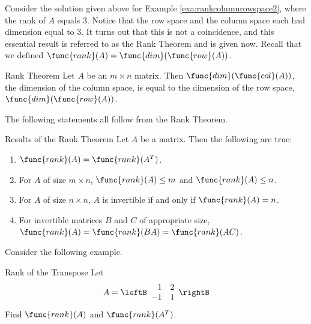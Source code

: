 Consider the solution given above for Example
\ref{exa:rankcolumnrowspace2}, where the rank of $A$ equals
$3$. Notice that the row space and the column space each had dimension
equal to $3$. It turns out that this is not a coincidence, and this
essential result is referred to as the Rank Theorem and is given
now. Recall that we defined $\func{rank}(A) = \func{dim}(\func{row}(A))$. 

\begin{theorem}{Rank Theorem}\label{thm:ranktheorem}
Let $A$ be an $m \times n$ matrix. Then $\func{dim}(\func{col} (A))$, the dimension of the column space, is equal to the dimension of the row space, $\func{dim}(\func{row}(A))$.
\end{theorem}

The following statements all follow from the Rank Theorem.

\begin{corollary}{Results of the Rank Theorem}\label{cor:ranktheorem}
Let $A$ be a matrix. Then the following are true:
\begin{enumerate}
\item
 $\func{rank}(A) = \func{rank}(A^T)$.
\item
For $A$ of size $m \times n$, $\func{rank}(A) \leq m$ and $\func{rank}(A) \leq n$.
\item
For $A$ of size $n \times n$,  $A$ is invertible if and only if $\func{rank}(A) = n$.
\item
For invertible matrices $B$ and $C$ of appropriate size, 
$\func{rank}(A) = \func{rank}(BA) = \func{rank}(AC)$. 
\end{enumerate}
\end{corollary}

Consider the following example.

\begin{example}{Rank of the Transpose}\label{exa:ranktranspose}
Let \[
A = 
\leftB
\begin{array}{rr}
1 & 2 \\
-1 & 1 
\end{array} \rightB
\]
Find $\func{rank}(A)$ and $\func{rank}(A^T)$.
\end{example}

